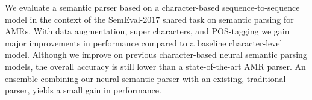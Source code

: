 We evaluate a semantic parser based on a character-based sequence-to-sequence model in the context of the SemEval-2017 shared task on semantic parsing for AMRs. With data augmentation, super characters, and POS-tagging we gain major improvements in performance compared to a baseline character-level model. Although we improve on previous character-based neural semantic parsing models, the overall accuracy is still lower than a state-of-the-art AMR parser. An ensemble combining our neural semantic parser with an existing, traditional parser, yields a small gain in performance.
